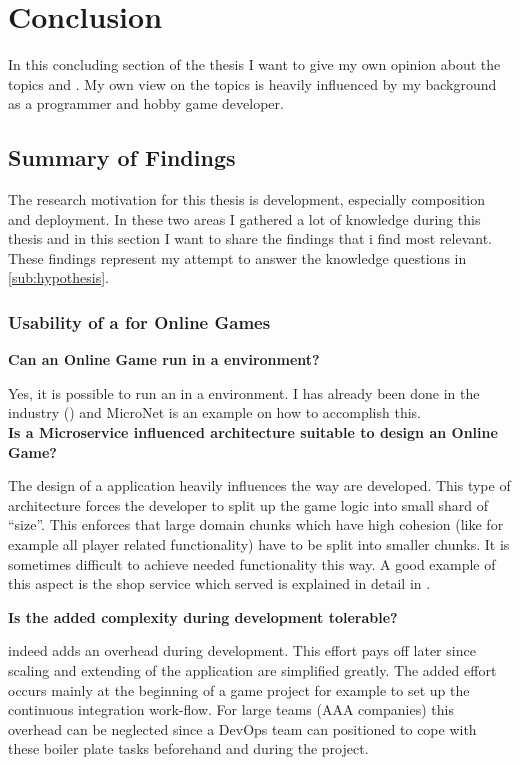 \chapter{Conclusion}

In this concluding section of the thesis I want to give my own opinion about the
topics \mss{} and \ogs{}. My own view on the topics is heavily influenced by my
background as a programmer and hobby game developer.

\section{Summary of Findings}

The research motivation for this thesis is \ms{} development, especially
\ms{} composition and deployment. In these two areas I gathered a lot of
knowledge during this thesis and in this section I want to share the findings
that i find most relevant. These findings represent my attempt to answer the
knowledge questions in \autoref{sub:hypothesis}.

\subsection{Usability of a \ms{} for Online Games}

\noindent
\textbf{Can an Online Game run in a \ms{} environment?}

Yes, it is possible to run an \og{} in a \ms{} environment. I has already been
done in the industry (\cite{pronschinske2015turbine}) and MicroNet is an example
on how to accomplish this.\\

\noindent
\textbf{Is a Microservice influenced architecture suitable to design an Online
Game?}

The design of a \mss{} application heavily influences the way \ogs{} are
developed. This type of architecture forces the developer to split up the game
logic into small shard of \ms{} ``size''. This enforces that large domain chunks
which have high cohesion (like for example all player related functionality)
have to be split into smaller chunks. It is sometimes difficult to achieve
needed functionality this way. A good example of this aspect is the shop service
which served is explained in detail in .

\noindent
\textbf{Is the added complexity during development tolerable?}

\ms{} indeed  adds an overhead during development. This effort pays off later
since scaling and extending of the application are simplified greatly. The added
effort occurs mainly at the beginning of a game project for example to set up
the continuous integration work-flow. For large teams (AAA companies) this
overhead can be neglected since a DevOps team can positioned to cope with these
boiler plate tasks beforehand and during the project.

